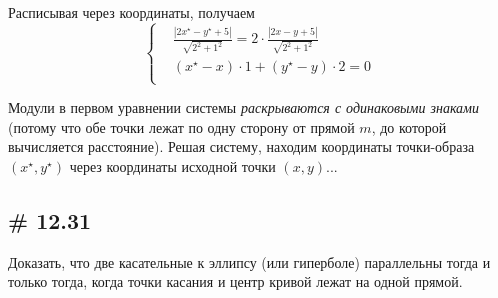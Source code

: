 \documentclass[a4paper,12pt]{article}
\begin{document}
\begin{solution}
    Расписывая через координаты, получаем
    \[
      \left\{
        \begin{aligned}
          &\frac{|2x^\star - y^\star + 5|}{\sqrt{2^2 + 1^2}} = 2 \cdot \frac{|2x - y + 5|}{\sqrt{2^2 + 1^2}}\\
          &(x^\star - x) \cdot 1 + (y^\star - y) \cdot 2 = 0\\
        \end{aligned}
      \right.
    \]
    
    Модули в первом уравнении системы \emph{раскрываются с одинаковыми знаками} (потому что обе точки лежат по одну сторону от прямой $m$, до которой вычисляется расстояние).
    Решая систему, находим координаты точки-образа $(x^\star, y^\star)$ через координаты исходной точки $(x, y)$...
  \end{solution}
  
  
  \subsection{\# 12.31}
  
  Доказать, что две касательные к эллипсу (или гиперболе) параллельны тогда и только тогда, когда точки касания и центр кривой лежат на одной прямой.
  
\end{document}
